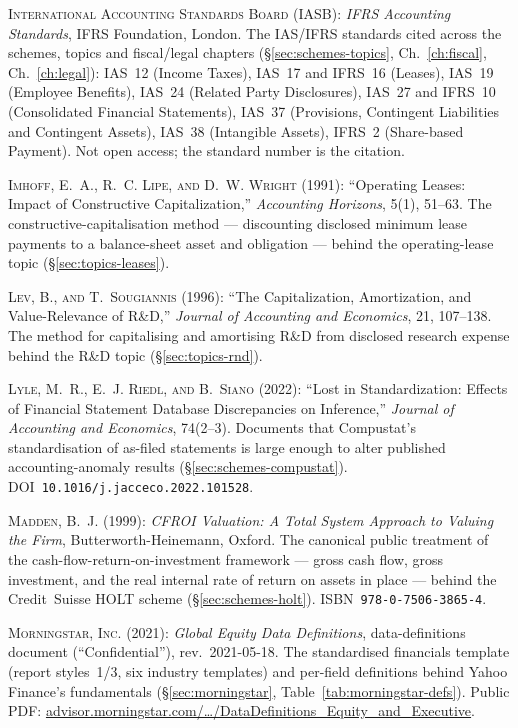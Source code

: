 \documentclass[11pt,a4paper]{report}
\begin{document}
\textsc{International Accounting Standards Board} (IASB): \emph{IFRS Accounting Standards}, IFRS Foundation,
London. The IAS/IFRS standards cited across the schemes, topics and fiscal/legal chapters (\S\ref{sec:schemes-topics},
Ch.~\ref{ch:fiscal}, Ch.~\ref{ch:legal}): IAS~12 (Income Taxes), IAS~17 and IFRS~16 (Leases), IAS~19 (Employee
Benefits), IAS~24 (Related Party Disclosures), IAS~27 and IFRS~10 (Consolidated Financial Statements), IAS~37
(Provisions, Contingent Liabilities and Contingent Assets), IAS~38 (Intangible Assets), IFRS~2 (Share-based
Payment). Not open access; the standard number is the citation.
\par

\textsc{Imhoff, E.~A., R.~C. Lipe, \textsc{and} D.~W. Wright} (1991): ``Operating Leases: Impact of
Constructive Capitalization,'' \emph{Accounting Horizons}, 5(1), 51--63. The constructive-capitalisation
method --- discounting disclosed minimum lease payments to a balance-sheet asset and obligation --- behind the
operating-lease topic (\S\ref{sec:topics-leases}).
\par

\textsc{Lev, B., \textsc{and} T.~Sougiannis} (1996): ``The Capitalization, Amortization, and Value-Relevance of
R\&D,'' \emph{Journal of Accounting and Economics}, 21, 107--138. The method for capitalising and amortising
R\&D from disclosed research expense behind the R\&D topic (\S\ref{sec:topics-rnd}).
\par

\textsc{Lyle, M.~R., E.~J. Riedl, \textsc{and} B.~Siano} (2022): ``Lost in Standardization: Effects of
Financial Statement Database Discrepancies on Inference,'' \emph{Journal of Accounting and Economics}, 74(2--3).
Documents that Compustat's standardisation of as-filed statements is large enough to alter published
accounting-anomaly results (\S\ref{sec:schemes-compustat}). DOI~\texttt{10.1016/j.jacceco.2022.101528}.
\par

\textsc{Madden, B.~J.} (1999): \emph{CFROI Valuation: A Total System Approach to Valuing the Firm},
Butterworth-Heinemann, Oxford. The canonical public treatment of the cash-flow-return-on-investment framework
--- gross cash flow, gross investment, and the real internal rate of return on assets in place --- behind the
Credit~Suisse HOLT scheme (\S\ref{sec:schemes-holt}). ISBN~\texttt{978-0-7506-3865-4}.
\par

\textsc{Morningstar, Inc.} (2021): \emph{Global Equity Data Definitions}, data-definitions document
(``Confidential''), rev.\ 2021-05-18. The standardised financials template (report styles~1/3, six industry
templates) and per-field definitions behind Yahoo Finance's fundamentals (\S\ref{sec:morningstar},
Table~\ref{tab:morningstar-defs}). Public PDF:
\href{https://advisor.morningstar.com/Enterprise/VTC/DataDefinitions_Equity\%20and\%20Executive_2021.05.18.pdf}%
{advisor.morningstar.com/\ldots/DataDefinitions\_Equity\_and\_Executive}.
\par
\end{document}
